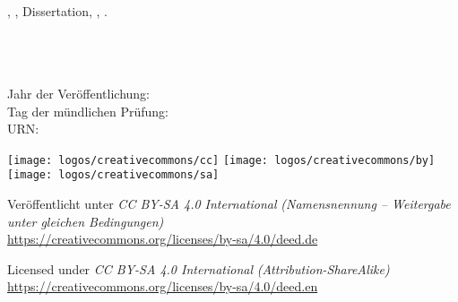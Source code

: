 

\thispagestyle{empty}

\ \vfill

\noindent%
\myName{}, \emph{\myTitle{}}, Dissertation, \myUni{}, \myYearPublication{}.

\bigskip

\begin{otherlanguage}{ngerman}

\noindent%
\myDepartmentDE{} \\
\myFacultyDE{} \\
\myUni{} \\
Jahr der Veröffentlichung: \myYearPublication{} \\
Tag der mündlichen Prüfung: \myTimePresent{} \\
URN:  \\

\bigskip

\noindent%
\texttt{[image: logos/creativecommons/cc]}
\texttt{[image: logos/creativecommons/by]}
\texttt{[image: logos/creativecommons/sa]}


\smallskip

\noindent%
Veröffentlicht unter \emph{CC BY-SA 4.0 International}
\emph{(Namensnennung -- Weitergabe unter gleichen Bedingungen)} \\
\url{https://creativecommons.org/licenses/by-sa/4.0/deed.de}

\end{otherlanguage}

\smallskip

\noindent%
Licensed under \emph{CC BY-SA 4.0 International}
\emph{(Attribution-ShareAlike)} \\
\url{https://creativecommons.org/licenses/by-sa/4.0/deed.en}
